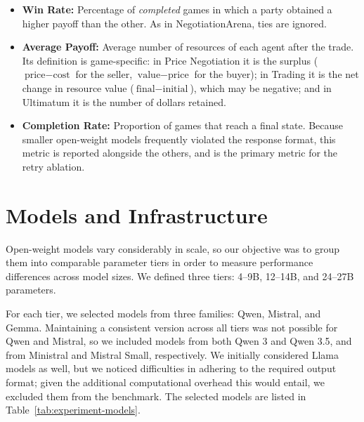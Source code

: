 \begin{itemize}
    \item \textbf{Win Rate:} Percentage of \textit{completed} games in which a party obtained a higher payoff than the other. As in NegotiationArena, ties are ignored.
    \item \textbf{Average Payoff:} Average number of resources of each agent after the trade. Its definition is game-specific: in Price Negotiation it is the surplus ($\text{price} - \text{cost}$ for the seller, $\text{value} - \text{price}$ for the buyer); in Trading it is the net change in resource value ($\text{final} - \text{initial}$), which may be negative; and in Ultimatum it is the number of dollars retained.
    \item \textbf{Completion Rate:} Proportion of games that reach a final state. Because smaller open-weight models frequently violated the response format, this metric is reported alongside the others, and is the primary metric for the retry ablation.
\end{itemize}

\section{Models and Infrastructure} \label{sec:models-infra}



Open-weight models vary considerably in scale, so our objective was to group them into comparable parameter tiers in order to measure performance differences across model sizes. We defined three tiers: 4–9B, 12–14B, and 24–27B parameters. 

For each tier, we selected models from three families: Qwen, Mistral, and Gemma. Maintaining a consistent version across all tiers was not possible for Qwen and Mistral, so we included models from both Qwen 3 and Qwen 3.5, and from Ministral and Mistral Small, respectively. We initially considered Llama models as well, but we noticed difficulties in adhering to the required output format; given the additional computational overhead this would entail, we excluded them from the benchmark. The selected models are listed in Table~\ref{tab:experiment-models}.

